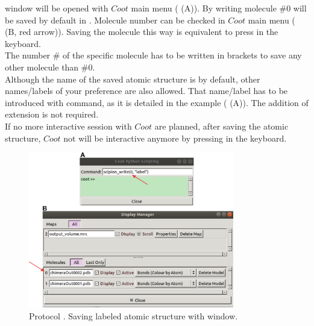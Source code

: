 \begin{itemize}
\begin{itemize}
\begin{itemize}
      window will be opened with $Coot$ main menu  ( (A)). By writing  molecule \#0 will be saved by default in \scipion. Molecule number can be checked in $Coot$ main menu  ( (B, red arrow)). Saving the molecule this way is equivalent to press  in the keyboard.\\The number \# of the specific molecule has to be written in brackets to save any other molecule than \#0.\\Although the name of the saved atomic structure is  by default, other names/labels of your preference are also allowed. That name/label has to be introduced with  command, as it is detailed in the example ( (A)). The addition of  extension is not required.\\If no more interactive session with $Coot$ are planned, after saving the atomic structure, $Coot$ not will be interactive anymore by pressing  in the keyboard.\\
     
      \begin{figure}[H]
       \centering 
       \captionsetup{width=.7\linewidth} 
       \includegraphics[width=0.80\textwidth]{Images_appendix/Fig120.pdf}
       \caption{Protocol . Saving labeled atomic structure with  window.}
      \label{fig:app_protocol_coot_2}
     \end{figure}
     
    
     
    \end{itemize}

    
    \end{itemize}
    
\end{itemize}


